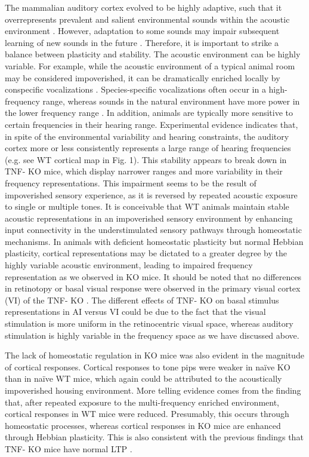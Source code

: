 The mammalian auditory cortex evolved to be highly adaptive, such that it overrepresents prevalent and salient environmental sounds within the acoustic environment \cite{Diamond1986, Gonzalez-Lima1986, Ohl1996, Pantev1998, Edeline1998, Gao2000, Zhang2001, Syka2002, Fritz2003, Mrsic-Flogel2003, Dean2005, Popescu2010, Cohen2011, Takahashi2011}. However, adaptation to some sounds may impair subsequent learning of new sounds in the future \cite{Sarro2011}. Therefore, it is important to strike a balance between plasticity and stability. The acoustic environment can be highly variable. For example, while the acoustic environment of a typical animal room may be considered impoverished, it can be dramatically enriched locally by conspecific vocalizations \cite{Kim2009, Grimsley2011}. Species-specific vocalizations often occur in a high-frequency range, whereas sounds in the natural environment have more power in the lower frequency range \cite{Liu2003, Kim2009}. In addition, animals are typically more sensitive to certain frequencies in their hearing range. Experimental evidence indicates that, in spite of the environmental variability and hearing constraints, the auditory cortex more or less consistently represents a large range of hearing frequencies (e.g. see WT cortical map in Fig. 1). This stability appears to break down in TNF-\textalpha{} KO mice, which display narrower ranges and more variability in their frequency representations. This impairment seems to be the result of impoverished sensory experience, as it is reversed by repeated acoustic exposure to single or multiple tones. It is conceivable that WT animals maintain stable acoustic representations in an impoverished sensory environment by enhancing input connectivity in the understimulated sensory pathways through homeostatic mechanisms. In animals with deficient homeostatic plasticity but normal Hebbian plasticity, cortical representations may be dictated to a greater degree by the highly variable acoustic environment, leading to impaired frequency representation as we observed in KO mice. It should be noted that no differences in retinotopy or basal visual response were observed in the primary visual cortex (VI) of the TNF-\textalpha{} KO \cite{Kaneko2008}. The different effects of TNF-\textalpha{} KO on basal stimulus representations in AI versus VI could be due to the fact that the visual stimulation is more uniform in the retinocentric visual space, whereas auditory stimulation is highly variable in the frequency space as we have discussed above.

The lack of homeostatic regulation in KO mice was also evident in the magnitude of cortical responses. Cortical responses to tone pips were weaker in na\"ive KO than in na\"ive WT mice, which again could be attributed to the acoustically impoverished housing environment. More telling evidence comes from the finding that, after repeated exposure to the multi-frequency enriched environment, cortical responses in WT mice were reduced. Presumably, this occurs through homeostatic processes, whereas cortical responses in KO mice are enhanced through Hebbian plasticity. This is also consistent with the previous findings that TNF-\textalpha{} KO mice have normal LTP \cite{Albensi2000, Stellwagen2006, Kaneko2008}.

